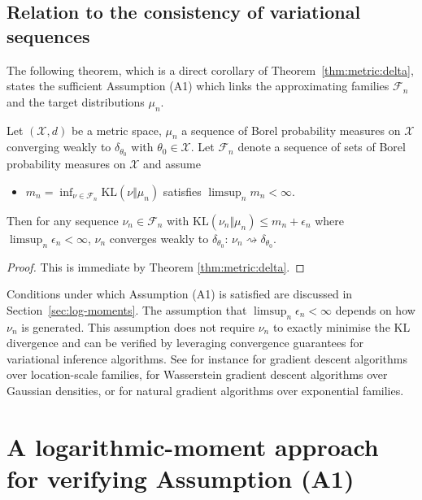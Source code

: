 \documentclass[11pt]{article}
\theoremstyle{plain}
\theoremstyle{definition}
\theoremstyle{remark}
\begin{document}
\subsection{Relation to the consistency of variational sequences}

The following theorem, which is a direct corollary of Theorem~\ref{thm:metric:delta}, states the sufficient Assumption (A1) which links the approximating families $\mathcal{F}_n$ and the target distributions $\mu_n$.

\begin{thm}
    Let $(\mathcal X,d)$ be a metric space, $\mu_n$ a sequence of Borel probability measures on $\mathcal X$ converging weakly to $\delta_{\theta_0}$ with $\theta_0 \in \mathcal X$.
    Let $\mathcal F_n$ denote a sequence of sets of Borel probability measures on $\mathcal X$ and
    assume
    \begin{itemize}[leftmargin=1.2cm]
        \item[$\mathrm{(A1)}$] $m_{n}=\inf_{\nu\in\mathcal{F}_{n}}\mathrm{KL}(\nu\Vert\mu_{n})$ satisfies $\limsup_n m_n < \infty$.
    \end{itemize}
    Then for any sequence $\nu_n \in \mathcal F_n$ with $\mathrm{KL}(\nu_n\Vert \mu_n) \leq m_n + \epsilon_n$ where $\limsup_n \epsilon_n<\infty$, $\nu_n$ converges weakly to $\delta_{\theta_0}$: $\nu_n\rightsquigarrow \delta_{\theta_0}$.
\end{thm}
\begin{proof}
    This is immediate by Theorem \ref{thm:metric:delta}.
\end{proof}


Conditions under which Assumption (A1) is satisfied are discussed in Section~\ref{sec:log-moments}. The assumption that $\limsup_n \epsilon_n < \infty$ depends on how $\nu_n$ is generated. This assumption does not require $\nu_n$ to exactly minimise the KL divergence and can be verified by leveraging convergence guarantees for variational inference algorithms. See for instance \cite{domke2023, kim2023} for gradient descent algorithms over location-scale families, \cite{lambert2022} for Wasserstein gradient descent algorithms over Gaussian densities, or \cite{wu2024} for natural gradient algorithms over exponential families.


\section{A logarithmic-moment approach for verifying Assumption (A1)}
\end{document}
